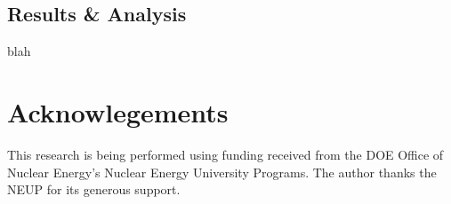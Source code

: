 \documentclass{anstrans}
\begin{document}
\subsection{Results \& Analysis}
blah
\section{Acknowlegements}
This research is being performed using funding received from the DOE Office of Nuclear Energy's Nuclear Energy University Programs. 
The author thanks the NEUP for its generous support.

\end{document}
